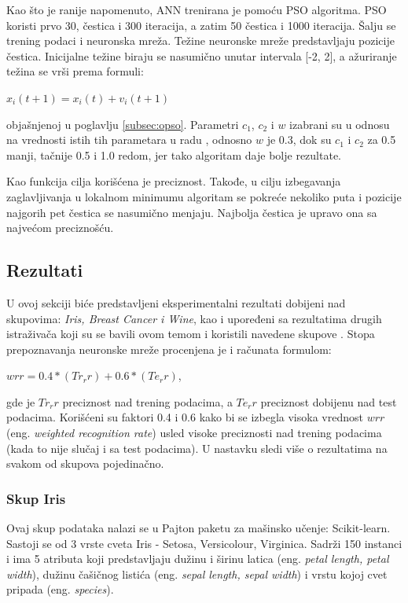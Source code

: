\documentclass[a4paper]{article}
\begin{document}
{Kao što je ranije napomenuto, ANN trenirana je pomoću PSO algoritma. PSO koristi prvo 30, čestica i 300 iteracija, a zatim 50 čestica i 1000 iteracija. 
Šalju se trening podaci i neuronska mreža. Težine neuronske mreže predstavljaju pozicije čestica. Inicijalne težine biraju se nasumično unutar intervala [-2, 2],
a ažuriranje težina se vrši prema formuli: 

\begin{center}
{$x_i(t+1) = x_i(t) + v_i(t+1)$}
\end{center}
objašnjenoj u poglavlju \ref{subsec:opso}. Parametri $c_1$, $c_2$ i $w$ izabrani su u odnosu na vrednosti istih tih parametara u radu \cite{hindawi},
odnosno $w$ je 0.3, dok su $c_1$ i $c_2$ za 0.5 manji, tačnije 0.5 i 1.0 redom, jer tako algoritam daje bolje rezultate. 

Kao funkcija cilja korišćena je preciznost. Takođe, u cilju izbegavanja zaglavljivanja u lokalnom minimumu algoritam se pokreće 
nekoliko puta i pozicije najgorih pet čestica se nasumično menjaju. Najbolja čestica je upravo ona sa najvećom preciznošću.

\subsection{Rezultati}
\label{rezultati}

U ovoj sekciji biće predstavljeni eksperimentalni rezultati dobijeni nad skupovima: \textit{Iris, Breast Cancer i Wine}, kao i upoređeni sa
rezultatima drugih istraživača koji su se bavili ovom temom i koristili navedene skupove \cite{hindawi}. Stopa prepoznavanja neuronske
mreže procenjena je i računata formulom:

\begin{center}
{$wrr = 0.4*(Tr_r r) + 0.6*(Te_r r)$}, 
\end{center}
gde je $Tr_r r$ preciznost nad trening podacima, a $Te_r r$ preciznost dobijenu nad test podacima. Korišćeni su faktori 0.4 i 0.6 
kako bi se izbegla visoka vrednost $wrr$ (eng. \emph{weighted recognition rate}) usled visoke preciznosti nad trening podacima 
(kada to nije slučaj i sa test podacima). U nastavku sledi više o rezultatima na svakom od skupova pojedinačno.

\subsubsection{Skup Iris}
\label{iris}

Ovaj skup podataka nalazi se u Pajton paketu za mašinsko učenje: Scikit-learn. Sastoji se od 3 vrste cveta Iris - Setosa, Versicolour, Virginica.
Sadrži 150 instanci i ima 5 atributa koji predstavljaju dužinu i širinu latica (eng. \emph{petal length, petal width}), dužinu čašičnog listića 
(eng. \emph{sepal length, sepal width}) i vrstu kojoj cvet pripada (eng. \emph{species}). 

}
\end{document}
